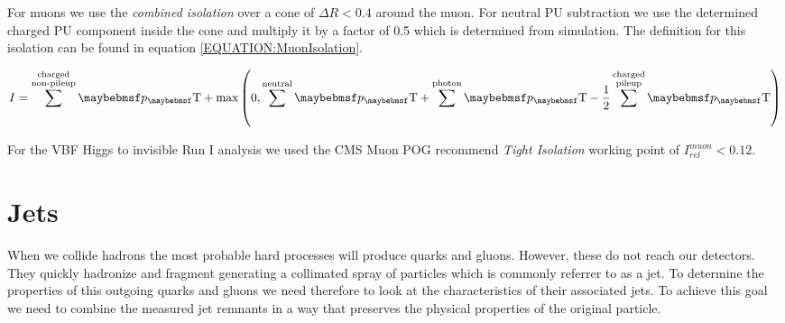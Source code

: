 

For muons we use the \textit{combined isolation} over a cone of $\Delta R < 0.4$ around the muon. For neutral \gls{PU} subtraction we use the determined charged \gls{PU} component inside the cone and multiply it by a factor of 0.5 which is determined from simulation. The definition for this isolation can be found in equation \ref{EQUATION:MuonIsolation}.

\begin{equation}
I = \sum^{\substack{\text{charged} \\ \text{non-pileup}}}\pT +
\text{max}\left(0,\sum^{\text{neutral}}\pT+\sum^{\text{photon}}\pT-\frac{1}{2}\sum^{\substack{\text{charged}
\\ \text{pileup}}}\pT\right)
\label{EQUATION:MuonIsolation}
\end{equation}

For the \gls{VBF} Higgs to invisible Run I analysis we used the \gls{CMS} Muon \gls{POG} recommend \textit{Tight Isolation} working point of $I_{rel}^{muon}<0.12$.


\section{Jets}
\label{SECTION:EventReconstructionAndSimulation_Jets}


When we collide hadrons the most probable hard processes will produce quarks and gluons. However, these do not reach our detectors. They quickly hadronize and fragment generating a collimated spray of particles which is commonly referrer to as a jet. To determine the properties of this outgoing quarks and gluons we need therefore to look at the characteristics of their associated jets. To achieve this goal we need to combine the measured jet remnants in a way that preserves the physical properties of the original particle.

